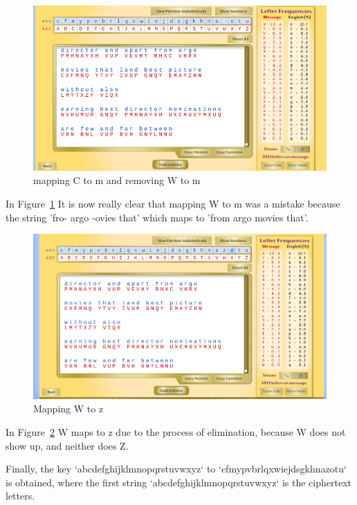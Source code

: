 \documentclass[12pt]{article}
\begin{document}
\begin{figure}[H]
    \begin{center}
        \includegraphics[scale=0.48]{c20.png}
    \end{center}{}
    \caption{mapping C to m and removing W to m}
    \label{fig:c20}
\end{figure}

In Figure~\ref{fig:c20} It is now really clear that mapping W to m was a mistake because the string 'fro- argo -ovies that' which maps to 'from argo movies that'.

\begin{figure}[!ht]
    \begin{center}
        \includegraphics[scale=0.48]{c21.png}
    \end{center}{}
    \caption{Mapping W to z}
    \label{fig:c21}
\end{figure}

In Figure~\ref{fig:c21} W maps to z due to the process of elimination, because W does not show up, and neither does Z.


Finally, the key `abcdefghijklmnopqrstuvwxyz` to `cfmypvbrlqxwiejdsgkhnazotu` is obtained, where the first string `abcdefghijklmnopqrstuvwxyz` is the ciphertext letters.
\end{document}

